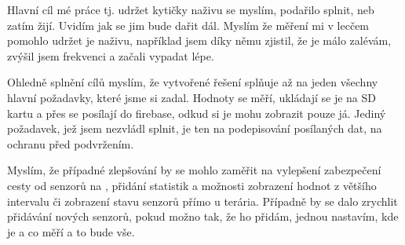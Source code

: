 Hlavní cíl mé práce tj. udržet kytičky naživu se myslím, podařilo splnit, neb zatím žijí. Uvidím jak se jim bude dařit 
dál. Myslím že měření mi v lecčem pomohlo udržet je naživu, například jsem díky němu zjistil, že je málo zalévám, zvýšil 
jsem frekvenci a začali vypadat lépe.

Ohledně splnění cílů myslím, že vytvořené řešení splňuje až na jeden všechny hlavní požadavky, které jsme si zadal. 
Hodnoty se měří, ukládají se je na SD kartu a přes  se posílají do \gls{firebase}, odkud si je 
mohu zobrazit pouze já. Jediný požadavek, jež jsem nezvládl splnit, je ten na podepisování posílaných dat, na ochranu 
před podvržením.

Myslím, že případné zlepšování by se mohlo zaměřit na vylepšení zabezpečení cesty od senzorů na , 
přidání statistik a možnosti zobrazení hodnot z většího intervalu či zobrazení stavu senzorů přímo u terária. Případně 
by se dalo zrychlit přidávání nových senzorů, pokud možno tak, že ho přidám, jednou nastavím, kde je a co měří a to bude 
vše.

